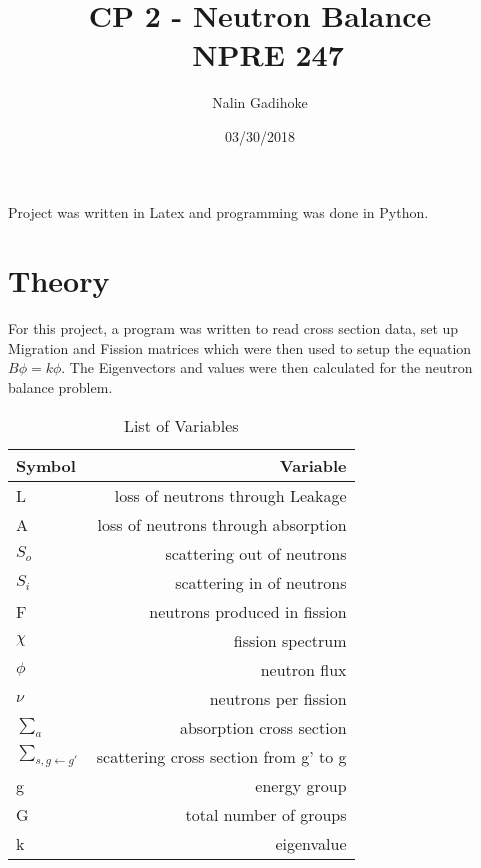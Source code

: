 \documentclass[11pt, oneside]{article}   	%
\title{CP 2 - Neutron Balance \\
\ NPRE 247}
\author{Nalin Gadihoke}
\date{03/30/2018}							%
\begin{document}
\maketitle
\thispagestyle{empty}


\clearpage


\tableofcontents{}
\thispagestyle{empty}
\clearpage
{}
Project was written in Latex and programming was done in Python.
\section{Theory}

For this project, a program was written to read cross section data, set up Migration and Fission matrices which were then used to setup the equation $B\phi = k\phi $. The Eigenvectors and values were then calculated for the neutron balance problem. 

\begin{table}[h!]
  \begin{center}
    \caption{List of Variables}
    \label{tab:table1}
    \begin{tabular}{l|r} 
      \textbf{Symbol} & \textbf{Variable}\\
      \hline
      L & loss of neutrons through Leakage\\
      A & loss of neutrons through absorption\\
      $S_{o}$ & scattering out of neutrons\\
      $S_i$ & scattering in of neutrons\\
      F & neutrons produced in fission\\
      $\chi$&fission spectrum\\
      $\phi$&neutron flux\\
      $\nu$&neutrons per fission\\
      $\sum _{a}$&absorption cross section\\
      $\sum _{s,g\leftarrow g'}$&scattering cross section from g' to g\\
      g & energy group\\
      G&total number of groups\\
      k & eigenvalue\\
    \end{tabular}
  \end{center}
\end{table}
 
\end{document}
